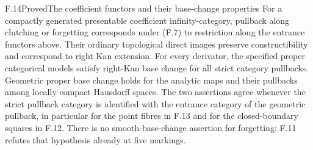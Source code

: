 \begin{statement}{F.14}{Proved}{The coefficient functors and their
base-change properties}
For a compactly generated presentable coefficient infinity-category,
pullback along clutching or forgetting corresponds under (F.7) to
restriction along the entrance functors above.  Their ordinary
topological direct images preserve constructibility and correspond
to right Kan extension.  For every derivator, the specified proper
categorical models satisfy right-Kan base change for all strict
category pullbacks.  Geometric proper base change holds for the
analytic maps and their pullbacks among locally compact Hausdorff
spaces.  The two assertions agree
whenever the strict pullback category is identified with the entrance
category of the geometric pullback, in particular for the point
fibres in F.13 and for the closed-boundary squares in F.12.  There is
no smooth-base-change assertion for forgetting: F.11 refutes that
hypothesis already at five markings.
\end{statement}
